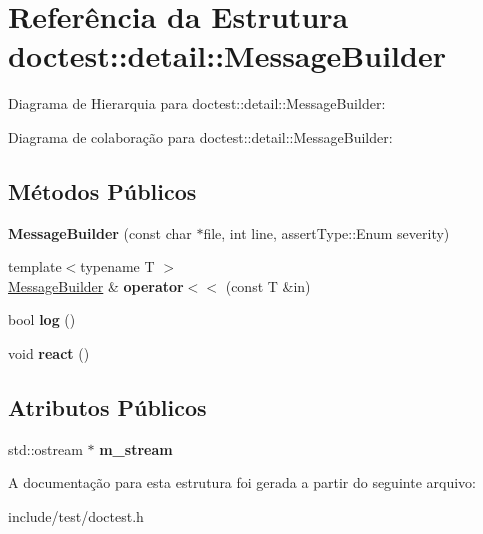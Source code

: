 \hypertarget{structdoctest_1_1detail_1_1MessageBuilder}{}\section{Referência da Estrutura doctest\+:\+:detail\+:\+:Message\+Builder}
\label{structdoctest_1_1detail_1_1MessageBuilder}


Diagrama de Hierarquia para doctest\+:\+:detail\+:\+:Message\+Builder\+:


Diagrama de colaboração para doctest\+:\+:detail\+:\+:Message\+Builder\+:
\subsection*{Métodos Públicos}
\begin{DoxyCompactItemize}
\item 
\mbox{\label{structdoctest_1_1detail_1_1MessageBuilder_a93cb6f180968d38cb0f18b08ec6c9000}} 
{\bfseries Message\+Builder} (const char $\ast$file, int line, assert\+Type\+::\+Enum severity)
\item 
\mbox{\label{structdoctest_1_1detail_1_1MessageBuilder_ab9059f961c58179c998c89fc221ec804}} 
{\footnotesize template$<$typename T $>$ }\\\hyperlink{structdoctest_1_1detail_1_1MessageBuilder}{Message\+Builder} \& {\bfseries operator$<$$<$} (const T \&in)
\item 
\mbox{\label{structdoctest_1_1detail_1_1MessageBuilder_a9bcc5d56e1764a7e07efebca55e43cce}} 
bool {\bfseries log} ()
\item 
\mbox{\label{structdoctest_1_1detail_1_1MessageBuilder_a3a65c5e39a0c04ae8e2a7c34997a2e4d}} 
void {\bfseries react} ()
\end{DoxyCompactItemize}
\subsection*{Atributos Públicos}
\begin{DoxyCompactItemize}
\item 
\mbox{\label{structdoctest_1_1detail_1_1MessageBuilder_a5319d522ba62c91e59ffa7f6982756e5}} 
std\+::ostream $\ast$ {\bfseries m\+\_\+stream}
\end{DoxyCompactItemize}


A documentação para esta estrutura foi gerada a partir do seguinte arquivo\+:\begin{DoxyCompactItemize}
\item 
include/test/doctest.\+h\end{DoxyCompactItemize}
